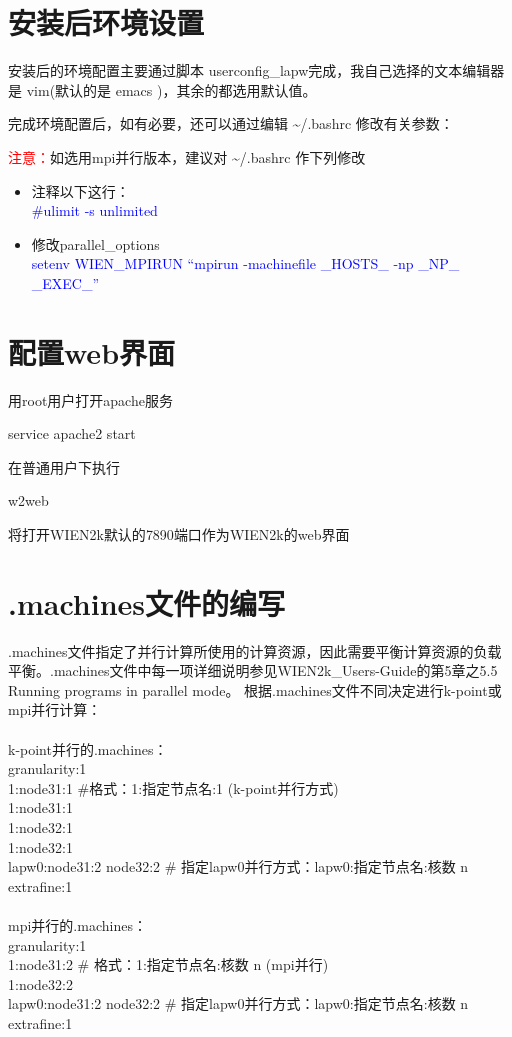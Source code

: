 \documentclass[10pt,a4paper]{article}
\newcommand{\upcite}[1]{\hspace{0ex}\textsuperscript{\cite{#1}}} %
\begin{document}
\section{安装后环境设置}
安装后的环境配置主要通过脚本 \textrm{userconfig\_lapw}完成，我自己选择的文本编辑器是 \textrm{vim}(默认的是 \textrm{emacs} )，其余的都选用默认值。

完成环境配置后，如有必要，还可以通过编辑 \~\//.bashrc 修改有关参数：

\textcolor{red}{注意：}如选用\textrm{mpi}并行版本，建议对 \~\//.bashrc 作下列修改
\begin{itemize}
	\item 注释以下这行：\\
\textcolor{blue}{\#ulimit -s unlimited}
	\item	修改parallel\_options\\
\textcolor{blue}{setenv WIEN\_MPIRUN ``mpirun -machinefile \_HOSTS\_ -np \_NP\_ \_EXEC\_''}
\end{itemize}

\section{配置web界面}
用\textrm{root}用户打开\textrm{apache}服务

service apache2 start

在普通用户下执行

\textrm{w2web}

将打开\textrm{WIEN2k}默认的\textrm{7890}端口作为\textrm{WIEN2k}的\textrm{web}界面

\section{.machines文件的编写}
\textrm{.machines}文件指定了并行计算所使用的计算资源，因此需要平衡计算资源的负载平衡。\textrm{.machines}文件中每一项详细说明参见\textrm{WIEN2k\_Users-Guide}\upcite{WIEN2K-UG_2001}的第\textrm{5}章之\textrm{5.5 Running programs in parallel mode}。
根据\textrm{.machines}文件不同决定进行\textrm{k-point}或\textrm{mpi}并行计算：\\\\
\textrm{k-point}并行的\textrm{.machines}：\\
granularity:1 \\
1:node31:1 \#格式：1:指定节点名:1 (\textrm{k-point}并行方式)\\
1:node31:1 \\
1:node32:1 \\
1:node32:1 \\
lapw0:node31:2 node32:2 \# 指定lapw0并行方式：lapw0:指定节点名:核数 n \\
extrafine:1 \\\\
\textrm{mpi}并行的\textrm{.machines}：\\
granularity:1 \\
1:node31:2 \# 格式：1:指定节点名:核数 n (\textrm{mpi}并行)\\
1:node32:2 \\
lapw0:node31:2 node32:2 \# 指定lapw0并行方式：lapw0:指定节点名:核数 n \\
extrafine:1
\end{document}
